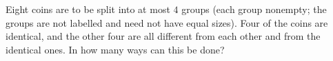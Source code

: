 Eight coins are to be split into at most $4$ groups (each group nonempty; the groups are not labelled and need not have equal sizes). Four of the coins are identical, and the other four are all different from each other and from the identical ones. In how many ways can this be done?
